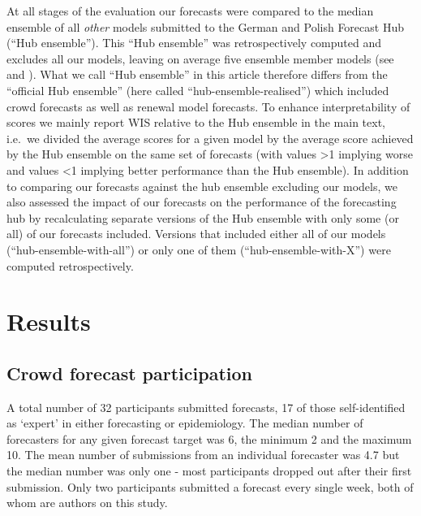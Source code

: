 \documentclass[10pt,letterpaper]{article}
\begin{document}
At all stages of the evaluation our forecasts were compared to the
median ensemble of all \emph{other} models submitted to the German and
Polish Forecast Hub (``Hub ensemble''). This ``Hub ensemble'' was
retrospectively computed and excludes all our models, leaving on average
five ensemble member models (see 
and ). What we call ``Hub ensemble''
in this article therefore differs from the ``official Hub ensemble''
(here called ``hub-ensemble-realised'') which included crowd forecasts
as well as renewal model forecasts. To enhance interpretability of
scores we mainly report WIS relative to the Hub ensemble in the main
text, i.e.~we divided the average scores for a given model by the
average score achieved by the Hub ensemble on the same set of forecasts
(with values \textgreater1 implying worse and values \textless1 implying
better performance than the Hub ensemble). In addition to comparing our
forecasts against the hub ensemble excluding our models, we also
assessed the impact of our forecasts on the performance of the
forecasting hub by recalculating separate versions of the Hub ensemble
with only some (or all) of our forecasts included. Versions that
included either all of our models (``hub-ensemble-with-all'') or only
one of them (``hub-ensemble-with-X'') were computed retrospectively.

\hypertarget{results}{%
\section{Results}\label{results}}

\hypertarget{crowd-forecast-participation}{%
\subsection{Crowd forecast
participation}\label{crowd-forecast-participation}}

A total number of 32 participants submitted forecasts, 17 of those
self-identified as `expert' in either forecasting or epidemiology. The
median number of forecasters for any given forecast target was 6, the
minimum 2 and the maximum 10. The mean number of submissions from an
individual forecaster was 4.7 but the median number was only one - most
participants dropped out after their first submission. Only two
participants submitted a forecast every single week, both of whom are
authors on this study.
\end{document}
